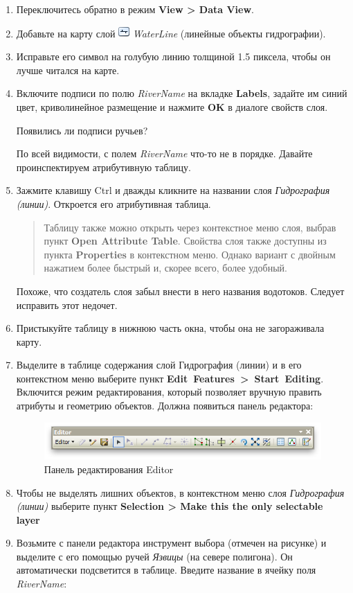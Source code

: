 \documentclass[]{book}
\theoremstyle{definition}
\theoremstyle{definition}
\theoremstyle{definition}
\theoremstyle{remark}
\begin{document}
\begin{enumerate}
\def\labelenumi{\arabic{enumi}.}
\item
  Переключитесь обратно в режим \textbf{View \textgreater{} Data View}.
\item
  Добавьте на карту слой \includegraphics{images/Ex03/image8.png}
  \emph{WaterLine} (линейные объекты гидрографии).
\item
  Исправьте его символ на голубую линию толщиной 1.5 пиксела, чтобы он
  лучше читался на карте.
\item
  Включите подписи по полю \emph{RiverName} на вкладке \textbf{Labels},
  задайте им синий цвет, криволинейное размещение и нажмите \textbf{OK}
  в диалоге свойств слоя.

  Появились ли подписи ручьев?

  По всей видимости, с полем \emph{RiverName} что-то не в порядке.
  Давайте проинспектируем атрибутивную таблицу.
\item
  Зажмите клавишу Ctrl и дважды кликните на названии слоя
  \emph{Гидрография (линии)}. Откроется его атрибутивная таблица.

  \begin{quote}
  Таблицу также можно открыть через контекстное меню слоя, выбрав пункт
  \textbf{Open Attribute Table}. Свойства слоя также доступны из пункта
  \textbf{Properties} в контекстном меню. Однако вариант с двойным
  нажатием более быстрый и, скорее всего, более удобный.
  \end{quote}

  Похоже, что создатель слоя забыл внести в него названия водотоков.
  Следует исправить этот недочет.
\item
  Пристыкуйте таблицу в нижнюю часть окна, чтобы она не загораживала
  карту.
\item
  Выделите в таблице содержания слой Гидрография (линии) и в его
  контекстном меню выберите пункт
  \textbf{Edit~Features~\textgreater{}~Start~Editing}. Включится режим
  редактирования, который позволяет вручную править атрибуты и геометрию
  объектов. Должна появиться панель редактора:

  \begin{figure}
  \centering
  \includegraphics{images/Ex03/image21.png}
  \caption{Панель редактирования Editor}
  \end{figure}
\item
  Чтобы не выделять лишних объектов, в контекстном меню слоя
  \emph{Гидрография (линии)} выберите пункт \textbf{Selection
  \textgreater{} Make this the only selectable layer}
\item
  Возьмите с панели редактора инструмент выбора (отмечен на рисунке) и
  выделите с его помощью ручей \emph{Язвицы} (на севере полигона). Он
  автоматически подсветится в таблице. Введите название в ячейку поля
  \emph{RiverName}:


\end{enumerate}
\end{document}
